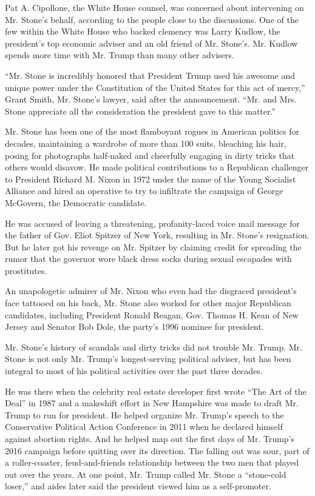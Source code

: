 Pat A. Cipollone, the White House counsel, was concerned about
intervening on Mr. Stone's behalf, according to the people close to the
discussions. One of the few within the White House who backed clemency
was Larry Kudlow, the president's top economic adviser and an old friend
of Mr. Stone's. Mr. Kudlow spends more time with Mr. Trump than many
other advisers.

``Mr. Stone is incredibly honored that President Trump used his awesome
and unique power under the Constitution of the United States for this
act of mercy,'' Grant Smith, Mr. Stone's lawyer, said after the
announcement. ``Mr. and Mrs. Stone appreciate all the consideration the
president gave to this matter.''

Mr. Stone has been one of the most flamboyant rogues in American
politics for decades, maintaining a wardrobe of more than 100 suits,
bleaching his hair, posing for photographs half-naked and cheerfully
engaging in dirty tricks that others would disavow. He made political
contributions to a Republican challenger to President Richard M. Nixon
in 1972 under the name of the Young Socialist Alliance and hired an
operative to try to infiltrate the campaign of George McGovern, the
Democratic candidate.

He was accused of leaving a threatening, profanity-laced voice mail
message for the father of Gov. Eliot Spitzer of New York, resulting in
Mr. Stone's resignation. But he later got his revenge on Mr. Spitzer by
claiming credit for spreading the rumor that the governor wore black
dress socks during sexual escapades with prostitutes.

An unapologetic admirer of Mr. Nixon who even had the disgraced
president's face tattooed on his back, Mr. Stone also worked for other
major Republican candidates, including President Ronald Reagan, Gov.
Thomas H. Kean of New Jersey and Senator Bob Dole, the party's 1996
nominee for president.

Mr. Stone's history of scandals and dirty tricks did not trouble Mr.
Trump. Mr. Stone is not only Mr. Trump's longest-serving political
adviser, but has been integral to most of his political activities over
the past three decades.

He was there when the celebrity real estate developer first wrote ``The
Art of the Deal'' in 1987 and a makeshift effort in New Hampshire was
made to draft Mr. Trump to run for president. He helped organize Mr.
Trump's speech to the Conservative Political Action Conference in 2011
when he declared himself against abortion rights. And he helped map out
the first days of Mr. Trump's 2016 campaign before quitting over its
direction. The falling out was sour, part of a roller-coaster,
feud-and-friends relationship between the two men that played out over
the years. At one point, Mr. Trump called Mr. Stone a ``stone-cold
loser,'' and aides later said the president viewed him as a
self-promoter.

